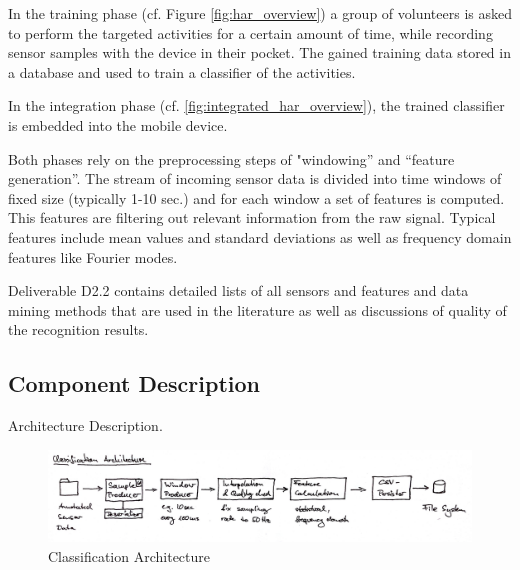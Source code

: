 In the training phase (cf. Figure \ref{fig:har_overview}) a group of
volunteers is asked to perform the targeted activities for a certain
amount of time, while recording sensor samples with the device in
their pocket.  The gained training data stored in a database and used
to train a classifier of the activities.

In the integration phase (cf. \ref{fig:integrated_har_overview}), the
trained classifier is embedded into the mobile device.

Both phases rely on the preprocessing steps of "windowing'' and
``feature generation''. The stream of incoming sensor data is divided into
time windows of fixed size (typically 1-10 sec.) and for each window
a set of features is computed. This features are filtering out
relevant information from the raw signal. Typical features include
mean values and standard deviations as well as frequency domain
features like Fourier modes.

Deliverable D2.2 contains detailed lists of all sensors and features
and data mining methods that are used in the literature as well as
discussions of quality of the recognition results.

\subsection{Component Description}\label{sec:har_component}

Architecture Description.

\begin{figure}[htbp]
\centering
\includegraphics[width=\textwidth]{img/har/classification_architecture.jpg}
\caption{Classification Architecture}\label{fig:classification_architecture}
\end{figure}

